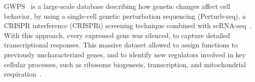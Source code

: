 \gls{GWPS}~\cite{RN89} is a large-scale database describing how genetic changes affect cell behavior, by using a single-cell genetic perturbation sequencing (Perturb-seq), a \gls{CRISPR} interference (CRISPRi) screening technique combined with \gls{scRNA-seq}~\cite{RN89}. With this approach, every expressed gene was silenced, to capture detailed transcriptional responses. This massive dataset allowed to assign functions to previously uncharacterized genes, and to identify new regulators involved in key cellular processes, such as ribosome biogenesis, transcription, and mitochondrial respiration~\cite{RN89}. 

